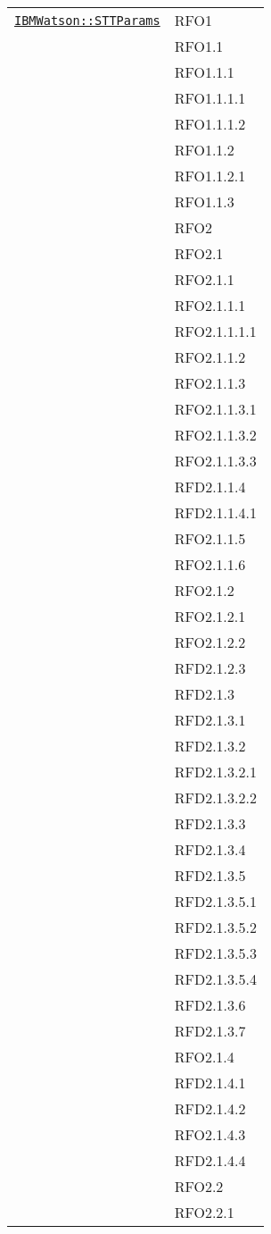 \begin{longtable}{|>{\centering}m{10cm}|m{3cm}<{\centering}|}
\hyperref[IBMWatson::STTParams]{\texttt{IBMWatson::STTParams}} & RFO1\\
& RFO1.1\\
& RFO1.1.1\\
& RFO1.1.1.1\\
& RFO1.1.1.2\\
& RFO1.1.2\\
& RFO1.1.2.1\\
& RFO1.1.3\\
& RFO2\\
& RFO2.1\\
& RFO2.1.1\\
& RFO2.1.1.1\\
& RFO2.1.1.1.1\\
& RFO2.1.1.2\\
& RFO2.1.1.3\\
& RFO2.1.1.3.1\\
& RFO2.1.1.3.2\\
& RFO2.1.1.3.3\\
& RFD2.1.1.4\\
& RFD2.1.1.4.1\\
& RFO2.1.1.5\\
& RFO2.1.1.6\\
& RFO2.1.2\\
& RFO2.1.2.1\\
& RFO2.1.2.2\\
& RFD2.1.2.3\\
& RFD2.1.3\\
& RFD2.1.3.1\\
& RFD2.1.3.2\\
& RFD2.1.3.2.1\\
& RFD2.1.3.2.2\\
& RFD2.1.3.3\\
& RFD2.1.3.4\\
& RFD2.1.3.5\\
& RFD2.1.3.5.1\\
& RFD2.1.3.5.2\\
& RFD2.1.3.5.3\\
& RFD2.1.3.5.4\\
& RFD2.1.3.6\\
& RFD2.1.3.7\\
& RFO2.1.4\\
& RFD2.1.4.1\\
& RFD2.1.4.2\\
& RFO2.1.4.3\\
& RFD2.1.4.4\\
& RFO2.2\\
& RFO2.2.1\\

\end{longtable}
